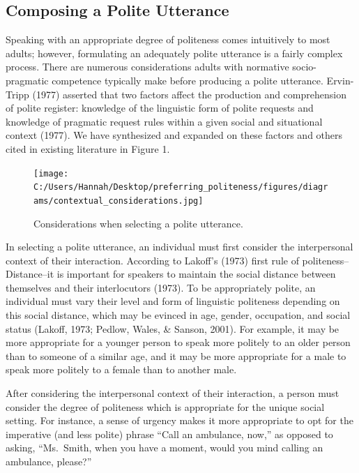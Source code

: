 \documentclass[
  english,
  man,floatsintext]{apa6}
\begin{document}
\hypertarget{composing-a-polite-utterance}{%
\subsection{Composing a Polite Utterance}\label{composing-a-polite-utterance}}

Speaking with an appropriate degree of politeness comes intuitively to most adults; however, formulating an adequately polite utterance is a fairly complex process. There are numerous considerations adults with normative socio-pragmatic competence typically make before producing a polite utterance. Ervin-Tripp (1977) asserted that two factors affect the production and comprehension of polite register: knowledge of the linguistic form of polite requests and knowledge of pragmatic request rules within a given social and situational context (1977). We have synthesized and expanded on these factors and others cited in existing literature in Figure 1.

\begin{figure}
\centering
\texttt{[image: C:/Users/Hannah/Desktop/preferring\_politeness/figures/diagrams/contextual\_considerations.jpg]}
\caption{Considerations when selecting a polite utterance.}
\end{figure}

In selecting a polite utterance, an individual must first consider the interpersonal context of their interaction. According to Lakoff's (1973) first rule of politeness--Distance--it is important for speakers to maintain the social distance between themselves and their interlocutors (1973). To be appropriately polite, an individual must vary their level and form of linguistic politeness depending on this social distance, which may be evinced in age, gender, occupation, and social status (Lakoff, 1973; Pedlow, Wales, \& Sanson, 2001). For example, it may be more appropriate for a younger person to speak more politely to an older person than to someone of a similar age, and it may be more appropriate for a male to speak more politely to a female than to another male.

After considering the interpersonal context of their interaction, a person must consider the degree of politeness which is appropriate for the unique social setting. For instance, a sense of urgency makes it more appropriate to opt for the imperative (and less polite) phrase ``Call an ambulance, now,'' as opposed to asking, ``Ms.~Smith, when you have a moment, would you mind calling an ambulance, please?''
\end{document}

